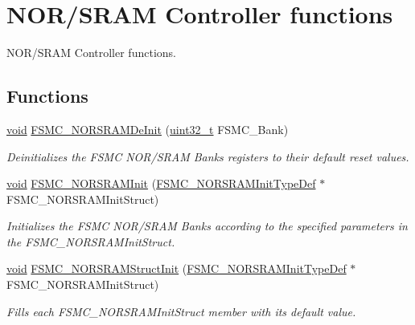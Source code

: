 \hypertarget{group___f_s_m_c___group1}{\section{N\-O\-R/\-S\-R\-A\-M Controller functions}
\label{group___f_s_m_c___group1}
}


N\-O\-R/\-S\-R\-A\-M Controller functions.  


\subsection*{Functions}
\begin{DoxyCompactItemize}
\item 
\hyperlink{group___n_a_m_e_ga18028b8badbf1ea7e704ccac3c488e82}{void} \hyperlink{group___f_s_m_c___group1_gaab3e6648e8a584e73785361ac960eded}{F\-S\-M\-C\-\_\-\-N\-O\-R\-S\-R\-A\-M\-De\-Init} (\hyperlink{stdint_8h_a435d1572bf3f880d55459d9805097f62}{uint32\-\_\-t} F\-S\-M\-C\-\_\-\-Bank)
\begin{DoxyCompactList}\small\item\em Deinitializes the F\-S\-M\-C N\-O\-R/\-S\-R\-A\-M Banks registers to their default reset values. \end{DoxyCompactList}\item 
\hyperlink{group___n_a_m_e_ga18028b8badbf1ea7e704ccac3c488e82}{void} \hyperlink{group___f_s_m_c___group1_ga9c27816e8b17394c9ee1ce9298917b4a}{F\-S\-M\-C\-\_\-\-N\-O\-R\-S\-R\-A\-M\-Init} (\hyperlink{struct_f_s_m_c___n_o_r_s_r_a_m_init_type_def}{F\-S\-M\-C\-\_\-\-N\-O\-R\-S\-R\-A\-M\-Init\-Type\-Def} $\ast$F\-S\-M\-C\-\_\-\-N\-O\-R\-S\-R\-A\-M\-Init\-Struct)
\begin{DoxyCompactList}\small\item\em Initializes the F\-S\-M\-C N\-O\-R/\-S\-R\-A\-M Banks according to the specified parameters in the F\-S\-M\-C\-\_\-\-N\-O\-R\-S\-R\-A\-M\-Init\-Struct. \end{DoxyCompactList}\item 
\hyperlink{group___n_a_m_e_ga18028b8badbf1ea7e704ccac3c488e82}{void} \hyperlink{group___f_s_m_c___group1_gaf33e6dfc34f62d16a0cb416de9e83d28}{F\-S\-M\-C\-\_\-\-N\-O\-R\-S\-R\-A\-M\-Struct\-Init} (\hyperlink{struct_f_s_m_c___n_o_r_s_r_a_m_init_type_def}{F\-S\-M\-C\-\_\-\-N\-O\-R\-S\-R\-A\-M\-Init\-Type\-Def} $\ast$F\-S\-M\-C\-\_\-\-N\-O\-R\-S\-R\-A\-M\-Init\-Struct)
\begin{DoxyCompactList}\small\item\em Fills each F\-S\-M\-C\-\_\-\-N\-O\-R\-S\-R\-A\-M\-Init\-Struct member with its default value. \end{DoxyCompactList}\item 

\end{DoxyCompactItemize}
